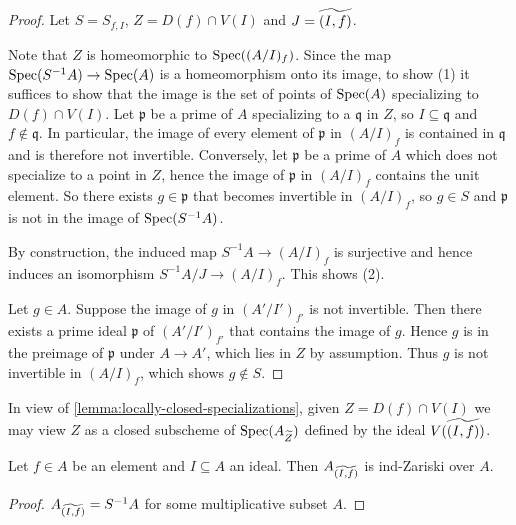 \begin{proof}
    \leanok
    Let $S = S_{f, I}$, $Z = D(f) \cap V(I)$ and $J = \widetilde{(I, f)}$.

    Note that $Z$ is homeomorphic to $\mathrm{Spec}((A/I)_f)$.
    Since the map $\mathrm{Spec}(S^{-1}A) \to \mathrm{Spec}(A)$ is a homeomorphism onto its image, to show (1)
    it suffices to show that the image is the set of points of $\mathrm{Spec}(A)$ specializing to $D(f) \cap V(I)$.
    Let $\mathfrak{p}$ be a prime of $A$ specializing to a $\mathfrak{q}$ in $Z$,
    so $I \subseteq \mathfrak{q}$ and $f \not\in \mathfrak{q}$. In particular, the image
    of every element of $\mathfrak{p}$ in $(A / I)_f$ is contained in $\mathfrak{q}$ and
    is therefore not invertible.
    Conversely, let $\mathfrak{p}$ be a prime of $A$ which does not specialize to a point in
    $Z$, hence
    the image of $\mathfrak{p}$ in $(A/I)_f$ contains the unit element. So there exists
    $g \in \mathfrak{p}$ that becomes invertible in $(A / I)_f$, so $g \in S$ and
    $\mathfrak{p}$ is not in the image of $\mathrm{Spec}(S^{-1} A)$.

    By construction, the induced map $S^{-1}A \to (A / I)_f$ is surjective and hence
    induces an isomorphism $S^{-1}A / J \to (A / I)_f$. This shows (2).

    Let $g \in A$. Suppose the image of $g$ in $(A' / I')_{f'}$ is not invertible.
    Then there exists a prime ideal $\mathfrak{p}$ of $(A' / I')_{f'}$ that contains the image of $g$.
    Hence $g$ is in the preimage of $\mathfrak{p}$ under $A \to A'$, which lies in $Z$ by assumption. Thus
    $g$ is not invertible in $(A / I)_f$, which shows $g \not\in S$.
\end{proof}

In view of \ref{lemma:locally-closed-specializations}, given $Z = D(f) \cap V(I)$ we may
view $Z$ as a closed subscheme of $\mathrm{Spec}(A_{\widetilde{Z}})$ defined by the ideal
$V( \widetilde{(I, f)})$.

\begin{lemma}
    Let $f \in A$ be an element and $I \subseteq A$ an ideal. Then
    $A_{\widetilde{(I, f)}}$ is ind-Zariski over $A$.
    \label{lemma:tilde-locclosed-ind-zariski}
    \leanok
\end{lemma}

\begin{proof}
    $A_{\widetilde{(I, f)}} = S^{-1} A$ for some multiplicative subset $A$.
    \leanok
\end{proof}

